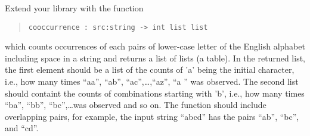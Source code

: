 \label{coocurrence}
Extend your library with the function
\begin{quote}
  \mbox{\lstinline!cooccurrence : src:string -> int list list!}
\end{quote}
which counts occurrences of each pairs of lower-case letter of the
English alphabet including space in a string and returns a list of
lists (a table).  In the returned list, the first element should be a
list of the counts of 'a' being the initial character, i.e., how many times ``aa'',
``ab'', ``ac'',\ldots,``az'', ``a '' was observed. The second list should containt
the counts of combinations starting with 'b', i.e., how many times
``ba'', ``bb'', ``bc'',\ldots was observed and so on. The function
should include overlapping pairs, for example, the input string
``abcd'' has the pairs ``ab'', ``bc'', and ``cd''.
